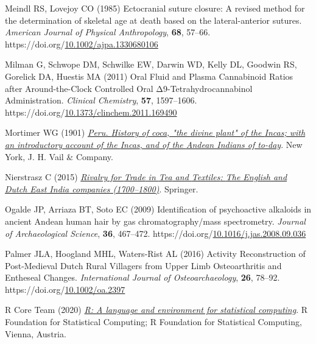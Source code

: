 \documentclass[
  11pt,
  leqno]{scrartcl}
\newlength{\cslhangindent}
\newenvironment{CSLReferences}[2] %
 {\begin{list}{}{%
  \setlength{\itemindent}{0pt}
  \setlength{\leftmargin}{0pt}
  \setlength{\parsep}{0pt}
  \ifodd #1
   \setlength{\leftmargin}{\cslhangindent}
   \setlength{\itemindent}{-1\cslhangindent}
  \fi
  \setlength{\itemsep}{#2\baselineskip}}}
 {\end{list}}
\begin{document}
\begin{CSLReferences}{1}{0}
Meindl RS, Lovejoy CO (1985) Ectocranial suture closure: {A} revised
method for the determination of skeletal age at death based on the
lateral-anterior sutures. \emph{American Journal of Physical
Anthropology}, \textbf{68}, 57--66.
https://doi.org/\href{https://doi.org/10.1002/ajpa.1330680106}{10.1002/ajpa.1330680106}

Milman G, Schwope DM, Schwilke EW, Darwin WD, Kelly DL, Goodwin RS,
Gorelick DA, Huestis MA (2011) Oral {Fluid} and {Plasma Cannabinoid
Ratios} after {Around-the-Clock Controlled Oral Δ9-Tetrahydrocannabinol
Administration}. \emph{Clinical Chemistry}, \textbf{57}, 1597--1606.
https://doi.org/\href{https://doi.org/10.1373/clinchem.2011.169490}{10.1373/clinchem.2011.169490}

Mortimer WG (1901)
\emph{\href{http://archive.org/details/peruhistoryofcoc00mortrich}{Peru.
{History} of coca, "the divine plant" of the {Incas}; with an
introductory account of the {Incas}, and of the {Andean Indians} of
to-day}}. {New York, J. H. Vail \& Company}.

Nierstrasz C (2015)
\emph{\href{https://books.google.com?id=uwtaCwAAQBAJ}{Rivalry for
{Trade} in {Tea} and {Textiles}: {The English} and {Dutch East India}
companies (1700--1800)}}. {Springer}.

Ogalde JP, Arriaza BT, Soto EC (2009) Identification of psychoactive
alkaloids in ancient {Andean} human hair by gas chromatography/mass
spectrometry. \emph{Journal of Archaeological Science}, \textbf{36},
467--472.
https://doi.org/\href{https://doi.org/10.1016/j.jas.2008.09.036}{10.1016/j.jas.2008.09.036}

Palmer JLA, Hoogland MHL, Waters‐Rist AL (2016) Activity
{Reconstruction} of {Post}‐{Medieval Dutch Rural Villagers} from {Upper
Limb Osteoarthritis} and {Entheseal Changes}. \emph{International
Journal of Osteoarchaeology}, \textbf{26}, 78--92.
https://doi.org/\href{https://doi.org/10.1002/oa.2397}{10.1002/oa.2397}

R Core Team (2020) \emph{\href{https://www.R-project.org/}{R: {A}
language and environment for statistical computing}}. {R Foundation for
Statistical Computing}; {R Foundation for Statistical Computing},
{Vienna, Austria}.


\end{CSLReferences}
\end{document}
